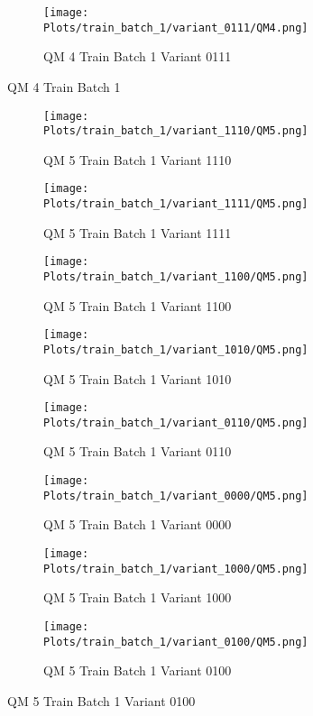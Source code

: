 \documentclass{DissertateFigs}
\begin{document}
\begin{figure}[t!]
\medskip

    \begin{subfigure}{0.47\textwidth}
    \texttt{[image: Plots/train\_batch\_1/variant\_0111/QM4.png]}
    \caption{QM 4 Train Batch 1 Variant 0111}
    \end{subfigure}
\caption{QM 4 Train Batch 1}
    \end{figure}
\clearpage
\begin{figure}[t!]
    \begin{subfigure}{0.47\textwidth}
    \texttt{[image: Plots/train\_batch\_1/variant\_1110/QM5.png]}
    \caption{QM 5 Train Batch 1 Variant 1110}
    \end{subfigure}
    \begin{subfigure}{0.47\textwidth}
    \texttt{[image: Plots/train\_batch\_1/variant\_1111/QM5.png]}
    \caption{QM 5 Train Batch 1 Variant 1111}
    \end{subfigure}

\medskip

    \begin{subfigure}{0.47\textwidth}
    \texttt{[image: Plots/train\_batch\_1/variant\_1100/QM5.png]}
    \caption{QM 5 Train Batch 1 Variant 1100}
    \end{subfigure}
    \begin{subfigure}{0.47\textwidth}
    \texttt{[image: Plots/train\_batch\_1/variant\_1010/QM5.png]}
    \caption{QM 5 Train Batch 1 Variant 1010}
    \end{subfigure}

\medskip

    \begin{subfigure}{0.47\textwidth}
    \texttt{[image: Plots/train\_batch\_1/variant\_0110/QM5.png]}
    \caption{QM 5 Train Batch 1 Variant 0110}
    \end{subfigure}
    \begin{subfigure}{0.47\textwidth}
    \texttt{[image: Plots/train\_batch\_1/variant\_0000/QM5.png]}
    \caption{QM 5 Train Batch 1 Variant 0000}
    \end{subfigure}

\medskip

    \begin{subfigure}{0.47\textwidth}
    \texttt{[image: Plots/train\_batch\_1/variant\_1000/QM5.png]}
    \caption{QM 5 Train Batch 1 Variant 1000}
    \end{subfigure}
    \begin{subfigure}{0.47\textwidth}
    \texttt{[image: Plots/train\_batch\_1/variant\_0100/QM5.png]}
    \caption{QM 5 Train Batch 1 Variant 0100}
    \end{subfigure}


\end{figure}
\end{document}
